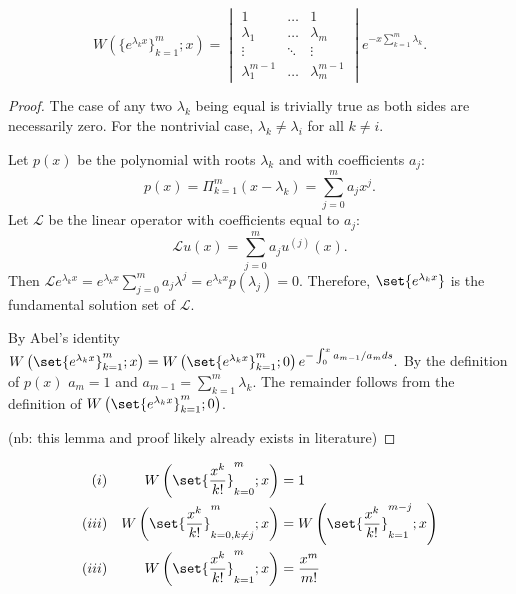 \documentclass{book}
\begin{document}
\begin{lemma}
\begin{equation*}
W(\{e^{\lambda_k x} \}_{k=1}^m; x) = \begin{vmatrix} 1 & \dots & 1 \\
\lambda_1 & \dots & \lambda_m \\
\vdots & \ddots & \vdots \\
\lambda_1^{m-1} & \dots & \lambda_m^{m-1} \end{vmatrix}
e^{-x \sum_{k=1}^m \lambda_k} .
\end{equation*}
\label{lem:exp}
\end{lemma}

\begin{proof}
The case of any two $\lambda_k$ being equal is trivially true as both sides are necessarily zero.
For the nontrivial case, $\lambda_k \neq \lambda_i$ for all $k \neq i$.

Let $p(x)$ be the polynomial with roots $\lambda_k$ and with coefficients $a_j$:
\begin{equation*}
p(x) = \Pi_{k=1}^m \left (x - \lambda_k \right) = \sum_{j=0}^m a_j x^j.
\end{equation*}
Let $\mathcal{L}$ be the linear operator with coefficients equal to $a_j$:
$$
\mathcal{L} u(x) = \sum_{j=0}^m a_j u^{(j)}(x).
$$
Then $\mathcal{L} e^{\lambda_k x} = e^{\lambda_k x} \sum_{j=0}^m a_j \lambda^j = e^{\lambda_k x} p(\lambda_j) = 0$.
Therefore, $\set{e^{\lambda_k x}}$ is the fundamental solution set of $\mathcal{L}$.

By Abel's identity $\W{\set{e^{\lambda_k x}}_{k=1}^m}{x} = \W{\set{e^{\lambda_k x}}_{k=1}^m}{0} e^{-\int_0^x a_{m-1} / a_m ds}.$
By the definition of $p(x)$ $a_m = 1$ and $a_{m-1} = \sum_{k=1}^m \lambda_k$.
The remainder follows from the definition of $\W{\set{e^{\lambda_k x}}_{k=1}^m}{0}$.

(nb: this lemma and proof likely already exists in literature)
\end{proof}

\newcommand{\Wpoly}[2]{\W{\set{\Poly{k}}_{#1}^{#2}}{x}}

\begin{lemma}
\begin{align*}
(i) && \Wpoly{k=0}{m} & = 1 \\
(iii) && \Wpoly{k=0,k \neq j}{m} & = \Wpoly{k=1}{m-j} \\
(iii) && \Wpoly{k=1}{m} & = \Poly{m}
\end{align*}
\label{lem:poly}
\end{lemma}
\end{document}
